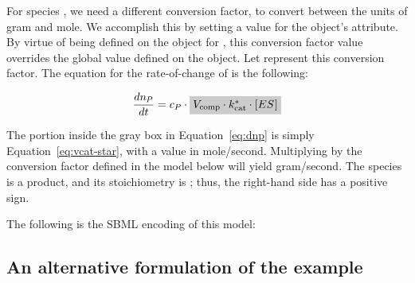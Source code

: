 For species , we need a different conversion factor, to
convert between the units of \unit{gram} and \unit{mole}.  We
accomplish this by setting a value for the \Species object's
 attribute.  By virtue of being defined on
the \Species object for , this conversion factor value
overrides the global value defined on the \Model object.  Let
\convP represent this conversion factor.  The equation for the
rate-of-change of  is the following:
\begin{linenomath}
  \begin{equation}\label{eq:dnp}
    \dfrac{d \nP}{d t} = \convP \cdot \colorbox{lightgray}{$\Vcomp \cdot \kcatnew \cdot \concent{ES}$}
  \end{equation}
\end{linenomath}
The portion inside the gray box in Equation~\ref{eq:dnp} is simply
Equation~\ref{eq:vcat-star}, with a value in mole/second.
Multiplying by the conversion factor  defined
in the model below will yield gram/second.  The species
 is a product, and its stoichiometry is ; thus,
the right-hand side has a positive sign.

The following is the SBML encoding of this model:



\subsection{An alternative formulation of the  example}
\label{sec:eg:conversionfactor2}

